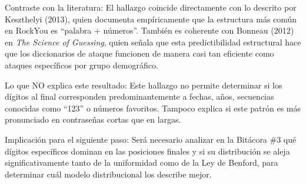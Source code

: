 \documentclass[12pt, letterpaper]{article}
\begin{document}
\noindent
Contraste con la literatura: El hallazgo coincide directamente con lo descrito por Keszthelyi (2013), quien documenta empíricamente que la estructura más común en RockYou es ``palabra + números''. También es coherente con Bonneau (2012) en \textit{The Science of Guessing}, quien señala que esta predictibilidad estructural hace que los diccionarios de ataque funcionen de manera casi tan eficiente como ataques específicos por grupo demográfico. \newline

\noindent
Lo que NO explica este resultado: Este hallazgo no permite determinar si los dígitos al final corresponden predominantemente a fechas, años, secuencias conocidas como ``123'' o números favoritos. Tampoco explica si este patrón es más pronunciado en contraseñas cortas que en largas. \newline

\noindent
Implicación para el siguiente paso: Será necesario analizar en la Bitácora \#3 qué dígitos específicos dominan en las posiciones finales y si su distribución se aleja significativamente tanto de la uniformidad como de la Ley de Benford, para determinar cuál modelo distribucional los describe mejor.
\end{document}
